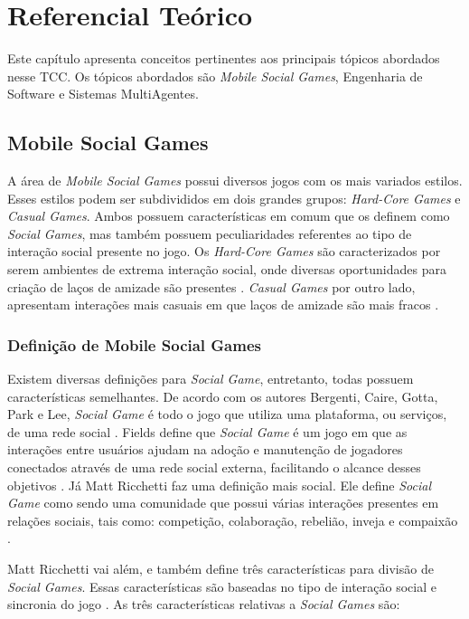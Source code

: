 \chapter[Referencial Teórico]{Referencial Teórico}

Este capítulo apresenta conceitos pertinentes aos principais tópicos abordados nesse TCC. Os tópicos abordados são \textit{Mobile Social Games}, Engenharia de Software e Sistemas MultiAgentes.

\section{Mobile Social Games}
A área de \textit{Mobile Social Games} possui diversos jogos com os mais variados estilos.
Esses estilos podem ser subdivididos em dois grandes grupos: \textit{Hard-Core Games} e \textit{Casual Games}. Ambos possuem características em comum que os definem como \textit{Social Games}, mas também possuem peculiaridades referentes ao tipo de interação social presente no jogo. Os \textit{Hard-Core Games} são caracterizados por serem ambientes de extrema interação social, onde diversas oportunidades para criação de laços de amizade são presentes \cite{cole2007}. \textit{Casual Games} por outro lado, apresentam interações mais casuais em que laços de amizade são mais fracos \cite{ricchetti2015}.

    \subsection{Definição de Mobile Social Games}
Existem diversas definições para \textit{Social Game}, entretanto, todas possuem características semelhantes. De acordo com os autores Bergenti, Caire, Gotta, Park e Lee, \textit{Social Game} é todo o jogo que utiliza uma plataforma, ou serviços, de uma rede social \cite{bergenti2013} \cite{park2012}. Fields define que \textit{Social Game} é um jogo em que as interações entre usuários ajudam na adoção e manutenção de jogadores conectados através de uma rede social externa, facilitando o alcance desses objetivos \cite{fields2014}. Já Matt Ricchetti faz uma definição mais social. Ele define \textit{Social Game} como sendo uma comunidade que possui várias interações presentes em relações sociais, tais como: competição, colaboração, rebelião, inveja e compaixão \cite{ricchetti2015}.

Matt Ricchetti vai além, e também define três características para divisão de \textit{Social Games}. Essas características são baseadas no tipo de interação social e sincronia do jogo \cite{ricchetti2015}. As três características relativas a \textit{Social Games} são:

